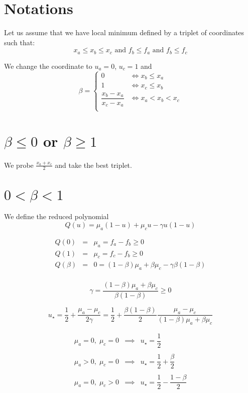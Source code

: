 \documentclass[aps,12pt]{revtex4}
\begin{document}
\section{Notations}
Let us assume that we have local minimum defined by a triplet of coordinates such that:
\begin{equation}
	x_a \leq x_b \leq x_c \text{ and } f_b \leq f_a \text{ and } f_b \leq f_c
\end{equation}

We change the coordinate to $u_a=0$, $u_c=1$ and
\begin{equation}
	\beta = \left\lbrace
	\begin{array}{cc}
	0 & \iff  x_b\leq x_a\\
	1 & \iff  x_c\leq x_b\\
	\dfrac{x_b-x_a}{x_c-x_a} & \iff x_a < x_b < x_c\\
	\end{array}
	\right.
\end{equation}

 
\section{$\beta\leq0$ or $\beta\geq1$}

We probe $\frac{x_a+x_c}2$ and take the best triplet.

\section{$0<\beta<1$}
We define the reduced polynomial
\begin{equation}
	Q(u) =  \mu_a (1-u) + \mu_c u - \gamma u(1-u)
\end{equation}	 
 
\begin{equation}
\begin{array}{rcl}
	Q(0) & = & \mu_a = f_a - f_b \geq 0\\
	Q(1) & = & \mu_c = f_c - f_b \geq 0\\
	Q(\beta) & = & 0 = (1-\beta)\mu_a + \beta \mu_c - \gamma \beta(1-\beta)\\
\end{array}
\end{equation}	

\begin{equation}
	\gamma = \dfrac{(1-\beta)\mu_a + \beta \mu_c}{\beta(1-\beta)}  \geq 0 
\end{equation}

\begin{equation}
	u_\star = \dfrac{1}{2} + \dfrac{\mu_a-\mu_c}{2\gamma} = \dfrac{1}{2} + \dfrac{\beta(1-\beta)}{2} 
	\dfrac{\mu_a-\mu_c}{(1-\beta)\mu_a + \beta \mu_c}
\end{equation}

\begin{equation}
\begin{array}{lcl}
\mu_a = 0, \;\mu_c = 0 & \implies & u_\star = \dfrac{1}{2}\\
\\
\mu_a > 0, \;\mu_c = 0 & \implies & u_\star = \dfrac{1}{2} + \dfrac{\beta}{2} \\
\\
\mu_a = 0, \;\mu_c > 0 & \implies & u_\star = \dfrac{1}{2} - \dfrac{1-\beta}{2} \\
\end{array}
\end{equation}
\end{document}
